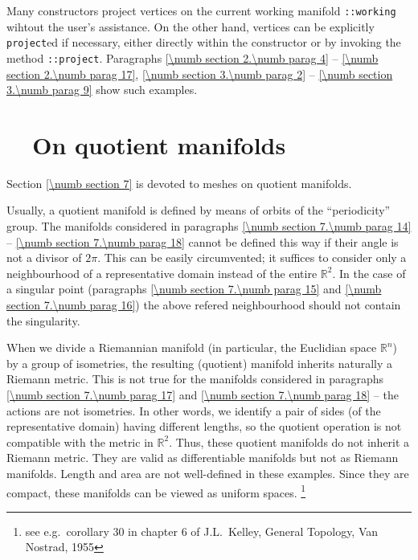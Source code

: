 Many {\small\tt{}} constructors project vertices on the current working manifold
{\small\tt{}::working} wihtout the user's assistance.
On the other hand, vertices can be explicitly {\small\tt project}ed if necessary,
either directly within the {\small\tt{}} constructor or by invoking the method
{\small\tt{}::project}.
Paragraphs \ref{\numb section 2.\numb parag 4} -- \ref{\numb section 2.\numb parag 17},
\ref{\numb section 3.\numb parag 2} -- \ref{\numb section 3.\numb parag 9} show such examples.


\section{~~On quotient manifolds}\label{\numb section 8.\numb parag 2}

Section \ref{\numb section 7} is devoted to meshes on quotient manifolds.

Usually, a quotient manifold is defined by means of orbits of the ``periodicity'' group.
The manifolds considered in paragraphs \ref{\numb section 7.\numb parag 14} --
\ref{\numb section 7.\numb parag 18} cannot be defined this way if their angle is not a
divisor of $ 2\pi $.
This can be easily circumvented; it suffices to consider only a neighbourhood of a representative
domain instead of the entire $ \mathbb{R}^2 $.
In the case of a singular point (paragraphs \ref{\numb section 7.\numb parag 15} and
\ref{\numb section 7.\numb parag 16}) the above refered neighbourhood should not contain
the singularity.

When we divide a Riemannian manifold (in particular, the Euclidian space $ \mathbb{R}^n $)
by a group of isometries, the resulting (quotient) manifold inherits naturally a Riemann metric.
This is not true for the manifolds considered in paragraphs \ref{\numb section 7.\numb parag 17}
and \ref{\numb section 7.\numb parag 18} -- the actions are not isometries.
In other words, we identify a pair of sides (of the representative domain) having different lengths,
so the quotient operation is not compatible with the metric in $ \mathbb{R}^2 $.
Thus, these quotient manifolds do not inherit a Riemann metric.
They are valid as differentiable manifolds but not as Riemann manifolds.
Length and area are not well-defined in these examples.
Since they are compact, these manifolds can be viewed as uniform spaces.%
\footnote {{} see e.g.\ corollary 30 in chapter 6 of J.L.~Kelley, General Topology, Van Nostrad, 1955}


